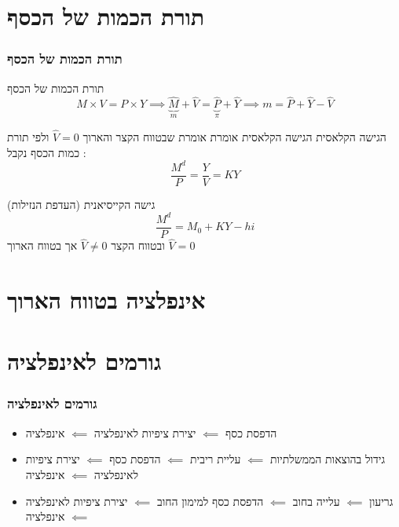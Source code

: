 \documentclass[usenames,dvipsnames]{beamer}
\begin{document}
\begin{RTL}
\begin{frame}[allowframebreaks]
\begin{center}
    \end{center}
    

\end{frame}

\section{תורת הכמות של הכסף}
\begin{frame}[allowframebreaks]
    \frametitle{תורת הכמות של הכסף}
    \begin{block}{תורת הכמות של הכסף}
        $$M \times V = P \times Y \implies \underbrace{\widehat{M}}_{m} + \widehat{V} = \underbrace{\widehat{P}}_{\pi} + \widehat{Y} \implies  m = \widehat{P} + \widehat{Y} - \widehat{V}$$
    \end{block}
    
    \begin{block}{הגישה הקלאסית}
        הגישה הקלאסית אומרת אומרת שבטווח הקצר והארוך $\widehat{V} = 0$ ולפי תורת כמות הכסף נקבל :
        $$\frac{M^d}{P} = \frac{Y}{V} = KY$$
    \end{block}

    \begin{block}{גישה הקייסיאנית (העדפת הנזילות)}
        $$\frac{M^d}{P} = M_0 + KY - hi$$
        ובטווח הקצר $\widehat{V} \neq 0$ אך בטווח הארוך $\widehat{V} = 0$
    \end{block}

\end{frame}


\section{אינפלציה בטווח הארוך}

\section{גורמים לאינפלציה}
\begin{frame}[allowframebreaks]
    \frametitle{גורמים לאינפלציה}
    \begin{itemize}
        \item הדפסת כסף $\impliedby$ יצירת ציפיות לאינפלציה $\impliedby$ אינפלציה
        \item גידול בהוצאות הממשלתיות $\impliedby$ עליית ריבית $\impliedby$ הדפסת כסף $\impliedby$ יצירת ציפיות לאינפלציה $\impliedby$ אינפלציה
        \item גריעון $\impliedby$ עלייה בחוב $ \impliedby$ הדפסת כסף למימון החוב $\impliedby$ יצירת ציפיות לאינפלציה $\impliedby$ אינפלציה
    \end{itemize}
    

\end{frame}
\end{RTL}
\end{document}
